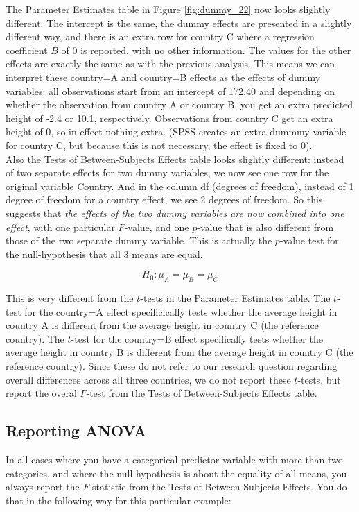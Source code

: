 \documentclass[]{report}\usepackage[]{graphicx}\usepackage[]{color}
\begin{document}
The Parameter Estimates table in Figure \ref{fig:dummy_22} now looks slightly different: The intercept is the same, the dummy effects are presented in a slightly different way, and there is an extra row for country C where a regression coefficient $B$ of 0 is reported, with no other information. The values for the other effects are exactly the same as with the previous analysis. This means we can interpret these country=A and country=B effects as the effects of dummy variables: all observations start from an intercept of 172.40 and depending on whether the observation from country A or country B, you get an extra predicted height of -2.4 or 10.1, respectively. Observations from country C get an extra height of 0, so in effect nothing extra. (SPSS creates an extra dummmy variable for country C, but because this is not necessary, the effect is fixed to 0).
\\
Also the Tests of Between-Subjects Effects table looks slightly different: instead of two separate effects for two dummy variables, we now see one row for the original variable Country. And in the column df (degrees of freedom), instead of 1 degree of freedom for a country effect, we see 2 degrees of freedom. So this suggests that \textit{the effects of the two dummy variables are now combined into one effect}, with one particular $F$-value, and one $p$-value that is also different from those of the two separate dummy variable. This is actually the $p$-value test for the null-hypothesis that all 3 means are equal. 

\begin{equation}
H_0: \mu_A= \mu_B=\mu_C
\end{equation}

This is very different from the $t$-tests in the Parameter Estimates table. The $t$-test for the country=A effect specificically tests whether the average height in country A is different from the average height in country C (the reference country). The $t$-test for the country=B effect specifically tests whether the average height in country B is different from the average height in country C (the reference country). Since these do not refer to our research question regarding overall differences across all three countries, we do not report these $t$-tests, but report the overal $F$-test from the Tests of Between-Subjects Effects table.

\subsection{Reporting ANOVA}
In all cases where you have a categorical predictor variable with more than two categories, and where the null-hypothesis is about the equality of all means, you always report the $F$-statistic from the Tests of Between-Subjects Effects. You do that in the following way for this particular example:
\end{document}
